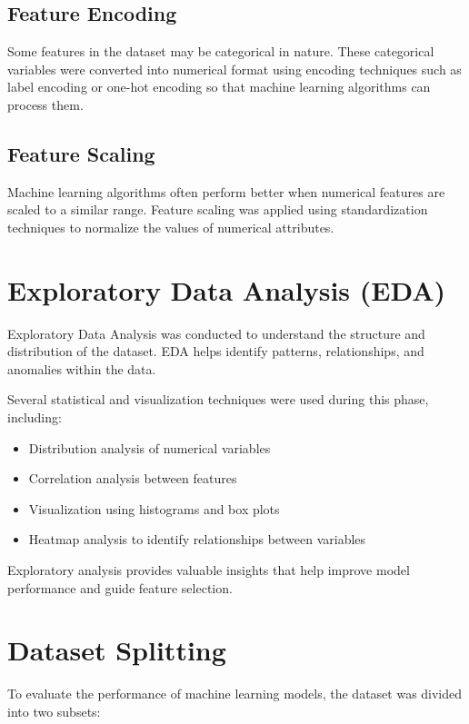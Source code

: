 \subsection{Feature Encoding}

Some features in the dataset may be categorical in nature. These categorical variables were converted into numerical format using encoding techniques such as label encoding or one-hot encoding so that machine learning algorithms can process them.

\subsection{Feature Scaling}

Machine learning algorithms often perform better when numerical features are scaled to a similar range. Feature scaling was applied using standardization techniques to normalize the values of numerical attributes.

\section{Exploratory Data Analysis (EDA)}

Exploratory Data Analysis was conducted to understand the structure and distribution of the dataset. EDA helps identify patterns, relationships, and anomalies within the data.

Several statistical and visualization techniques were used during this phase, including:

\begin{itemize}
\item Distribution analysis of numerical variables
\item Correlation analysis between features
\item Visualization using histograms and box plots
\item Heatmap analysis to identify relationships between variables
\end{itemize}

Exploratory analysis provides valuable insights that help improve model performance and guide feature selection.

\section{Dataset Splitting}

To evaluate the performance of machine learning models, the dataset was divided into two subsets:

